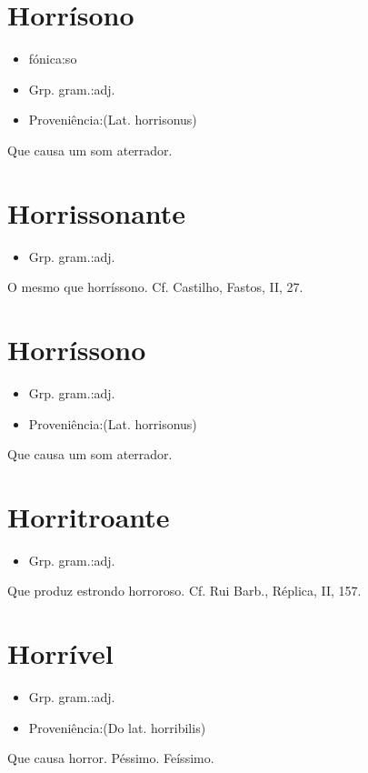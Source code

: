 \documentclass{article}
\begin{document}
\section{Horrísono}
\begin{itemize}
\item {fónica:so}
\end{itemize}
\begin{itemize}
\item {Grp. gram.:adj.}
\end{itemize}
\begin{itemize}
\item {Proveniência:(Lat. \textunderscore horrisonus\textunderscore )}
\end{itemize}
Que causa um som aterrador.
\section{Horrissonante}
\begin{itemize}
\item {Grp. gram.:adj.}
\end{itemize}
O mesmo que \textunderscore horríssono\textunderscore . Cf. Castilho, \textunderscore Fastos\textunderscore , II, 27.
\section{Horríssono}
\begin{itemize}
\item {Grp. gram.:adj.}
\end{itemize}
\begin{itemize}
\item {Proveniência:(Lat. \textunderscore horrisonus\textunderscore )}
\end{itemize}
Que causa um som aterrador.
\section{Horritroante}
\begin{itemize}
\item {Grp. gram.:adj.}
\end{itemize}
Que produz estrondo horroroso. Cf. Rui Barb., \textunderscore Réplica\textunderscore , II, 157.
\section{Horrível}
\begin{itemize}
\item {Grp. gram.:adj.}
\end{itemize}
\begin{itemize}
\item {Proveniência:(Do lat. \textunderscore horribilis\textunderscore )}
\end{itemize}
Que causa horror.
Péssimo.
Feíssimo.
\end{document}
